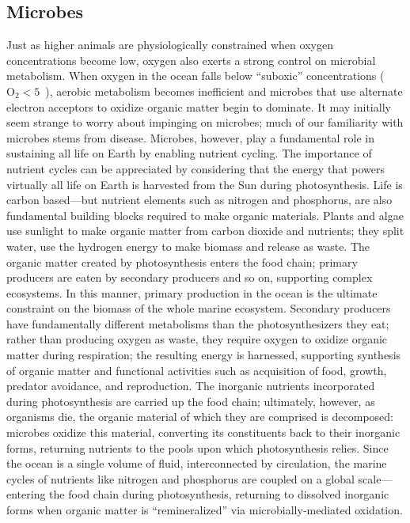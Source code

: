 \documentclass{report_chapter}
\begin{document}
\subsection{Microbes}

Just as higher animals are physiologically constrained when oxygen concentrations become low, oxygen also exerts a strong control on microbial metabolism.
When oxygen in the ocean falls below ``suboxic'' concentrations ($\mathrm{O}_2 < 5$~\mmolmmm{}), aerobic metabolism becomes inefficient and microbes that use alternate electron acceptors to oxidize organic matter begin to dominate.
It may initially seem strange to worry about impinging on microbes; much of our familiarity with microbes stems from disease.
Microbes, however, play a fundamental role in sustaining all life on Earth by enabling nutrient cycling.
The importance of nutrient cycles can be appreciated by considering that the energy that powers virtually all life on Earth is harvested from the Sun during photosynthesis.
Life is carbon based---but nutrient elements such as nitrogen and phosphorus, are also fundamental building blocks required to make organic materials.
Plants and algae use sunlight to make organic matter from carbon dioxide and nutrients; they split water, use the hydrogen energy to make biomass and release \OO{} as waste.
The organic matter created by photosynthesis enters the food chain; primary producers are eaten by secondary producers and so on, supporting complex ecosystems.
In this manner, primary production in the ocean is the ultimate constraint on the biomass of the whole marine ecosystem.
Secondary producers have fundamentally different metabolisms than the photosynthesizers they eat; rather than producing oxygen as waste, they require oxygen to oxidize organic matter during respiration; the resulting energy is harnessed, supporting synthesis of organic matter and functional activities such as acquisition of food, growth, predator avoidance, and reproduction.
The inorganic nutrients incorporated during photosynthesis are carried up the food chain; ultimately, however, as organisms die, the organic material of which they are comprised is decomposed: microbes oxidize this material, converting its constituents back to their inorganic forms, returning nutrients to the pools upon which photosynthesis relies.
Since the ocean is a single volume of fluid, interconnected by circulation, the marine cycles of nutrients like nitrogen and phosphorus are coupled on a global scale---entering the food chain during photosynthesis, returning to dissolved inorganic forms when organic matter is ``remineralized'' via microbially-mediated oxidation.
\end{document}
